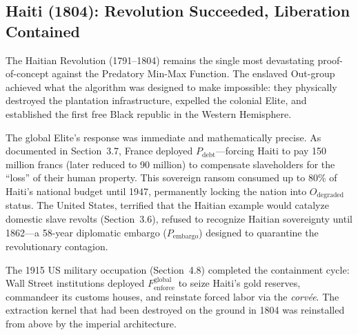 \subsection{Haiti (1804): Revolution Succeeded, Liberation Contained}

The Haitian Revolution (1791--1804) remains the single most devastating proof-of-concept against the Predatory Min-Max Function. The enslaved Out-group achieved what the algorithm was designed to make impossible: they physically destroyed the plantation infrastructure, expelled the colonial Elite, and established the first free Black republic in the Western Hemisphere.

The global Elite's response was immediate and mathematically precise. As documented in Section~3.7, France deployed $P_{\text{debt}}$---forcing Haiti to pay 150 million francs (later reduced to 90 million) to compensate slaveholders for the ``loss'' of their human property. This sovereign ransom consumed up to 80\% of Haiti's national budget until 1947, permanently locking the nation into $O_{\text{degraded}}$ status. The United States, terrified that the Haitian example would catalyze domestic slave revolts (Section~3.6), refused to recognize Haitian sovereignty until 1862---a 58-year diplomatic embargo ($P_{\text{embargo}}$) designed to quarantine the revolutionary contagion.

The 1915 US military occupation (Section~4.8) completed the containment cycle: Wall Street institutions deployed $F_{\text{enforce}}^{\text{global}}$ to seize Haiti's gold reserves, commandeer its customs houses, and reinstate forced labor via the \textit{corv\'{e}e}. The extraction kernel that had been destroyed on the ground in 1804 was reinstalled from above by the imperial architecture.

